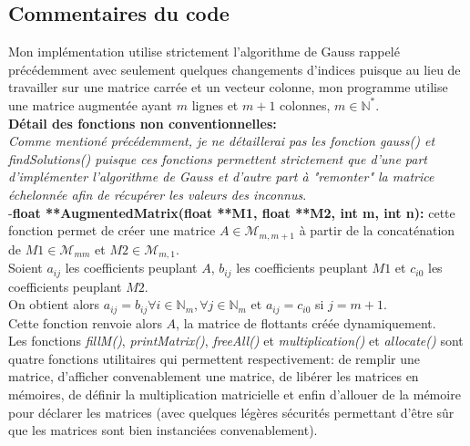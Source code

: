 \subsection{Commentaires du code}
Mon implémentation utilise strictement l'algorithme de Gauss rappelé précédemment avec seulement quelques changements d'indices puisque au lieu de travailler sur une matrice carrée et un vecteur colonne, mon programme utilise une matrice augmentée ayant $m$ lignes et $m+1$ colonnes, $m\in \mathbb{N}^*$. \\
\textbf{Détail des fonctions non conventionnelles:}\\
\textit{Comme mentioné précédemment, je ne détaillerai pas les fonction \textit{gauss()} et \textit{findSolutions()} puisque ces fonctions permettent strictement que d'une part d'implémenter l'algorithme de Gauss et d'autre part à "remonter" la matrice échelonnée afin de récupérer les valeurs des inconnus}. \\
-\textbf{float **AugmentedMatrix(float **M1, float **M2, int m, int n):} cette fonction permet de créer une matrice $A \in \mathcal{M}_{m,m+1}$ à partir de la concaténation de $M1 \in \mathcal{M}_{mm}$ et $M2 \in \mathcal{M}_{m,1}$. \\
Soient $a_{ij}$ les coefficients peuplant $A$, $b_{ij}$ les coefficients peuplant $M1$ et $c_{i0}$ les coefficients peuplant $M2$. \\
On obtient alors $a_{ij} = b_{ij} \forall i \in \mathbb{N}_{m}, \forall j \in \mathbb{N}_{m}$ et $a_{ij} = c_{i0}$ si $j = m+1$. \\
Cette fonction renvoie alors $A$, la matrice de flottants créée dynamiquement. \\
Les fonctions \textit{fillM()}, \textit{printMatrix()}, \textit{freeAll()} et \textit{multiplication()} et \textit{allocate()} sont quatre fonctions utilitaires qui permettent respectivement: de remplir une matrice, d'afficher convenablement une matrice, de libérer les matrices en mémoires, de définir la multiplication matricielle et enfin d'allouer de la mémoire pour déclarer les matrices (avec quelques légères sécurités permettant d'être sûr que les matrices sont bien instanciées convenablement). 

